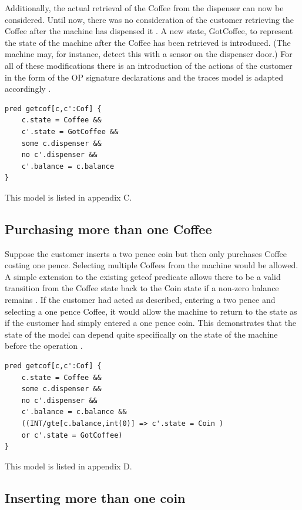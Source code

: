 \documentclass[a4paper,10pt]{report}
\begin{document}
 Additionally, the actual retrieval of the Coffee from the dispenser can now be considered. Until now, there was no consideration of the customer retrieving the Coffee after the machine has dispensed it \cite{Boyatt}. A new state, GotCoffee, to represent the state of the machine after the Coffee has been retrieved is introduced. (The machine may, for instance, detect this with a sensor on the dispenser door.) For all of these modifications there is an introduction of the actions of the customer in the form of the OP signature declarations and the traces model is adapted accordingly \cite{Boyatt}.
 
\begin{verbatim}
pred getcof[c,c':Cof] {
	c.state = Coffee &&
	c'.state = GotCoffee &&
	some c.dispenser &&
	no c'.dispenser &&
	c'.balance = c.balance
}
\end{verbatim}

 This model is listed in appendix C.
 
\subsection{Purchasing more than one Coffee}
\label{Purchasing more than one coffee}

Suppose the customer inserts a two pence coin but then only purchases Coffee costing one pence. Selecting multiple Coffees from the machine would be allowed. A simple extension to the existing getcof predicate allows there to be a valid transition from the Coffee state back to the Coin state if a non-zero balance remains \cite{Boyatt}. If the customer had acted as described, entering a two pence and selecting a one pence Coffee, it would allow the machine to return to the state as if the customer had simply entered a one pence coin. This demonstrates that the state of the model can depend quite specifically on the state of the machine before the operation \cite{Boyatt}.

\begin{verbatim}
pred getcof[c,c':Cof] {
	c.state = Coffee &&
	some c.dispenser &&
	no c'.dispenser &&
	c'.balance = c.balance &&
	((INT/gte[c.balance,int(0)] => c'.state = Coin )
	or c'.state = GotCoffee)
}
\end{verbatim}

This model is listed in appendix D.

\subsection{Inserting more than one coin}
\label{Inserting more than one coin}
\end{document}
